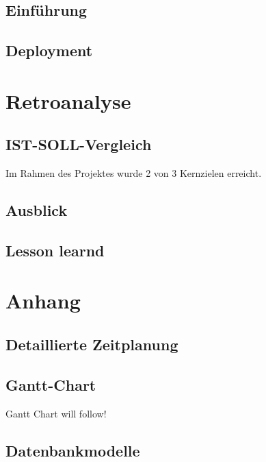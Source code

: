\documentclass[10pt, oneside]{article}
\begin{document}
  \subsection{Einführung}
  \subsection{Deployment}
  \section{Retroanalyse}
  \subsection{IST-SOLL-Vergleich}
    Im Rahmen des Projektes wurde 2 von 3 Kernzielen erreicht. 
  \subsection{Ausblick}\label{sec:future}
  \subsection{Lesson learnd}
  \newpage
  \setcounter{section}{0}
  \setcounter{page}{1}
  \renewcommand{\thesection}{\MakeUppercase{\alph{section}}}
  \section{Anhang}
  \subsection{Detaillierte Zeitplanung}\label{sec:detailTime}
  \subsection{Gantt-Chart}\label{sec:GanttChart}
    Gantt Chart will follow!
    \newpage
  \subsection{Datenbankmodelle}
\end{document}
